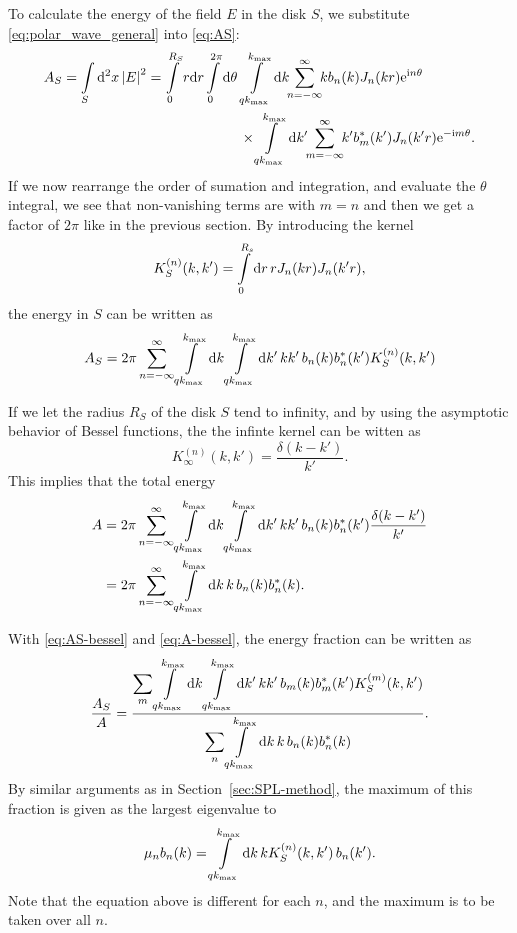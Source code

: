 \documentclass[11pt,a4paper, 
swedish,english %
]{article}
\begin{document}
To calculate the energy of the field $E$ in the disk $S$, we
substitute \eqref{eq:polar_wave_general} into \eqref{eq:AS}: 
\begin{equation}
\begin{aligned}
A_S= \int_S \rd^2x\, \abs{E}^2 = 
\int_0^{R_S} r\rd{r} \int_0^{2\pi} \rd\theta \,&
\int_{qk_{\max}}^{k_{\max}} \rd{k}\!\!
\sum_{n= -\infty}^{\infty}\!\! kb_n(k) J_n(kr)\ee^{\ii n \theta}\\
&\times
\int_{qk_{\max}}^{k_{\max}} \rd{k'}\!\!
\sum_{m= -\infty}^{\infty}\!\! k'b_m^*(k') J_n(k'r)\ee^{-\ii m
  \theta}.
\end{aligned}
\end{equation}
If we now rearrange the order of sumation and integration, and
evaluate the $\theta$ integral, we see that non-vanishing terms are
with $m=n$ and then we get a factor of $2\pi$ like in the previous
section. By introducing the kernel 
\begin{equation}\label{eq:KS-bessel}
K_S^{(n)}(k, k') = \int_{0}^{R_s} \rd{r}\, r J_n(kr) J_n(k'r),
\end{equation}
the energy in $S$ can be written as
\begin{equation}\label{eq:AS-bessel}
A_S =2\pi \sum_{n=-\infty}^{\infty} 
\int_{qk_{\max}}^{k_{\max}} \rd{k} \int_{qk_{\max}}^{k_{\max}} \rd{k'}\,  
kk'\, b_n(k)b_n^*(k') K_S^{(n)}(k, k')
\end{equation}

If we let the radius $R_S$ of the disk $S$ tend to infinity, and by
using the asymptotic behavior of Bessel functions, the the infinte
kernel can be witten as
\begin{equation}
K_\infty^{(n)}(k,k') = \frac{\delta(k-k')}{k'}.
\end{equation}
This implies that the total energy
\begin{equation}\label{eq:A-bessel}
\begin{aligned}
A &=2\pi \sum_{n=-\infty}^{\infty} 
\int_{qk_{\max}}^{k_{\max}} \rd{k} \int_{qk_{\max}}^{k_{\max}} \rd{k'}\,  
kk'\, b_n(k)b_n^*(k') \frac{\delta(k-k')}{k'} \\
&=2\pi \sum_{n=-\infty}^{\infty} 
\int_{qk_{\max}}^{k_{\max}} \rd{k} \, k\, b_n(k)b_n^*(k).
\end{aligned}
\end{equation}

With \eqref{eq:AS-bessel} and \eqref{eq:A-bessel}, the energy fraction
can be written as
\begin{equation}\label{eq:E-frac-bessel}
\frac{A_S}{A}
=\frac{\displaystyle{\sum_{m}} \int_{qk_{\max}}^{k_{\max}} \rd{k} \int_{qk_{\max}}^{k_{\max}} \rd{k'}\,  
kk'\, b_m(k)b_m^*(k') K_S^{(m)}(k, k')}
{\displaystyle{\sum_{n}} \int_{qk_{\max}}^{k_{\max}} \rd{k} \, k\, b_n(k)b_n^*(k)}.
\end{equation}
By similar arguments as in Section~\ref{sec:SPL-method}, the maximum
of this fraction is given as the largest eigenvalue to
\begin{equation}
\mu_nb_n(k) = \int_{qk_{\max}}^{{k_{\max}}}\rd{k}\,k K_S^{(n)}(k, k')\,b_n(k').
\end{equation}
Note that the equation above is different for each $n$, and the
maximum is to be taken over all $n$.
\end{document}
